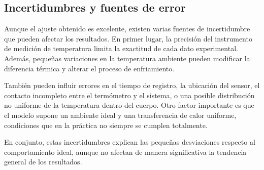 \subsection{Incertidumbres y fuentes de error}

Aunque el ajuste obtenido es excelente, existen varias fuentes de incertidumbre que pueden afectar los resultados. En primer lugar, la precisión del instrumento de medición de temperatura limita la exactitud de cada dato experimental. Además, pequeñas variaciones en la temperatura ambiente pueden modificar la diferencia térmica y alterar el proceso de enfriamiento.

También pueden influir errores en el tiempo de registro, la ubicación del sensor, el contacto incompleto entre el termómetro y el sistema, o una posible distribución no uniforme de la temperatura dentro del cuerpo. Otro factor importante es que el modelo supone un ambiente ideal y una transferencia de calor uniforme, condiciones que en la práctica no siempre se cumplen totalmente.

En conjunto, estas incertidumbres explican las pequeñas desviaciones respecto al comportamiento ideal, aunque no afectan de manera significativa la tendencia general de los resultados.

